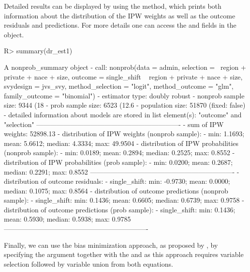 \documentclass[nojss]{jss}
\begin{document}
Detailed results can be displayed by using the  method,
which prints both information about the distribution of the IPW weights
as well as the outcome residuals and predictions. For more details one
can access the  and  fields in the
 object.

\begin{CodeChunk}
\begin{CodeInput}
R> summary(dr_est1)
\end{CodeInput}
\begin{CodeOutput}
A nonprob_summary object
 - call: nonprob(data = admin, selection = ~region + private + nace + 
    size, outcome = single_shift ~ region + private + nace + 
    size, svydesign = jvs_svy, method_selection = "logit", 
    method_outcome = "glm", 
    family_outcome = "binomial")
 - estimator type: doubly robust
 - nonprob sample size: 9344 (18%
 - prob sample size: 6523 (12.6%
 - population size: 51870 (fixed: false)
 - detailed information about models are stored in list element(s): 
    "outcome" and "selection"
----------------------------------------------------------------
 - sum of IPW weights: 52898.13 
 - distribution of IPW weights (nonprob sample):
   - min: 1.1693; mean: 5.6612; median: 4.3334; max: 49.9504
 - distribution of IPW probabilities (nonprob sample):
   - min: 0.0189; mean: 0.2894; median: 0.2525; max: 0.8552
 - distribution of IPW probabilities (prob sample):
   - min: 0.0200; mean: 0.2687; median: 0.2291; max: 0.8552
----------------------------------------------------------------
 - distribution of outcome residuals:
   - single_shift: min: -0.9730; mean: 0.0000; median: 0.1075; max: 0.8564
 - distribution of outcome predictions (nonprob sample):
   - single_shift: min: 0.1436; mean: 0.6605; median: 0.6739; max: 0.9758
 - distribution of outcome predictions (prob sample):
   - single_shift: min: 0.1436; mean: 0.5930; median: 0.5938; max: 0.9785
----------------------------------------------------------------
\end{CodeOutput}
\end{CodeChunk}

Finally, we can use the bias minimization approach, as proposed by
\citet{yang_doubly_2020}, by specifying the
 argument
together with the  and
 as this approach requires variable
selection followed by variable union from both equations.
\end{document}
